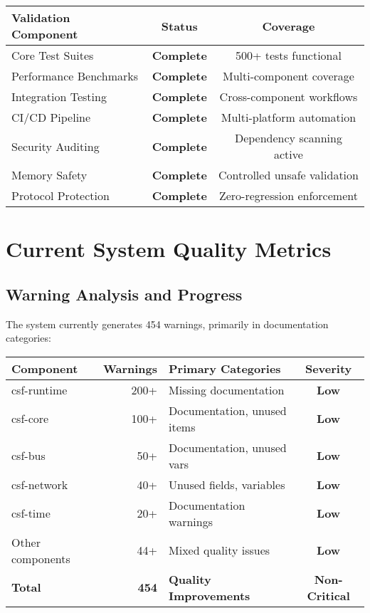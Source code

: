 \documentclass[11pt,a4paper]{article}
\newcommand{\warning}[1]{\textcolor{warningorange}{\textbf{#1}}}
\newcommand{\success}[1]{\textcolor{successgreen}{\textbf{#1}}}
\begin{document}
\begin{center}
\begin{tabular}{|l|c|c|}
\hline
\textbf{Validation Component} & \textbf{Status} & \textbf{Coverage} \\
\hline
Core Test Suites & \success{Complete} & 500+ tests functional \\
Performance Benchmarks & \success{Complete} & Multi-component coverage \\
Integration Testing & \success{Complete} & Cross-component workflows \\
CI/CD Pipeline & \success{Complete} & Multi-platform automation \\
Security Auditing & \success{Complete} & Dependency scanning active \\
Memory Safety & \success{Complete} & Controlled unsafe validation \\
Protocol Protection & \success{Complete} & Zero-regression enforcement \\
\hline
\end{tabular}
\end{center}

\section{Current System Quality Metrics}

\subsection{Warning Analysis and Progress}

The system currently generates 454 warnings, primarily in documentation categories:

\begin{center}
\begin{tabular}{|l|r|l|c|}
\hline
\textbf{Component} & \textbf{Warnings} & \textbf{Primary Categories} & \textbf{Severity} \\
\hline
csf-runtime & 200+ & Missing documentation & \warning{Low} \\
csf-core & 100+ & Documentation, unused items & \warning{Low} \\
csf-bus & 50+ & Documentation, unused vars & \warning{Low} \\
csf-network & 40+ & Unused fields, variables & \warning{Low} \\
csf-time & 20+ & Documentation warnings & \warning{Low} \\
Other components & 44+ & Mixed quality issues & \warning{Low} \\
\hline
\textbf{Total} & \textbf{454} & \textbf{Quality Improvements} & \warning{\textbf{Non-Critical}} \\
\hline
\end{tabular}
\end{center}
\end{document}
